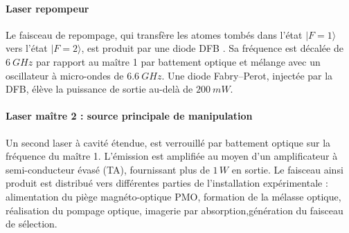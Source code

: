 \paragraph{Laser repompeur}
Le faisceau de repompage, qui transfère les atomes tombés  dans l’état $|F=1\rangle$ vers l’état $|F=2\rangle$, est produit par une diode \gls{DFB} . Sa fréquence est décalée de $6~GHz$ par rapport au maître 1 par battement optique et mélange avec un oscillateur à micro-ondes de $6.6~GHz$. Une diode Fabry–Perot, injectée par la \gls{DFB}, élève la puissance de sortie au-delà de $200~mW$.


\paragraph{Laser maître 2 : source principale de manipulation}
Un second laser à cavité étendue, est verrouillé par battement optique sur la fréquence du maître 1. L’émission est amplifiée au moyen d’un amplificateur à semi-conducteur évasé (\gls{TA}), fournissant plus de $1\,W$ en sortie. Le faisceau ainsi produit est distribué vers différentes parties de l’installation expérimentale : alimentation du piège magnéto-optique \gls{PMO}, formation de la mélasse optique, réalisation du pompage optique, imagerie par absorption,génération du faisceau de sélection.




